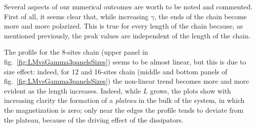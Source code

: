 Several aspects of our numerical outcomes are worth to be noted and commented. First of all, it seems clear that, while increasing $\gamma$, the ends of the chain become more and more polarized. This is true for every length of the chain because, as mentioned previously, the peak values are independent of the length of the chain.

The profile for the 8-sites chain (upper panel in fig.~\ref{fig:LMvsGamma3panelsSizes}) seems to be almost linear, but this is due to size effect: indeed, for 12 and 16-sites chain (middle and bottom panels of fig.~\ref{fig:LMvsGamma3panelsSizes}) the non-linear trend becomes more and more evident as the length increases. Indeed, while $L$ grows, the plots show with increasing clarity the formation of a \emph{plateau} in the bulk of the system, in which the magnetization is zero; only near the edges the profile tends to deviate from the plateau, because of the driving effect of the dissipators.

